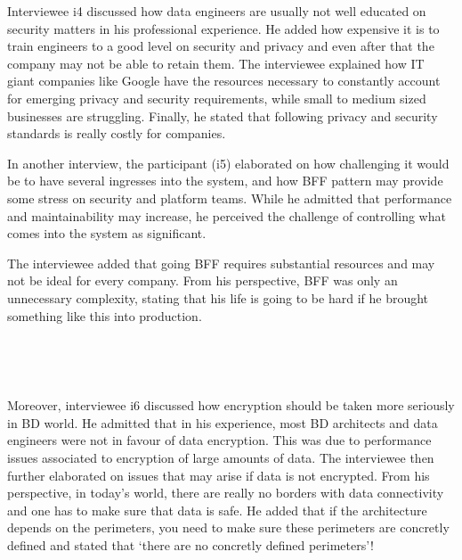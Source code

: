 \documentclass{bmcart}
\begin{document}
Interviewee i4 discussed how data engineers are usually not well educated on security matters in his professional experience. He added how expensive it is to train engineers to a good level on security and privacy and even after that the company may not be able to retain them. The interviewee explained how IT giant companies like Google have the resources necessary to constantly account for emerging privacy and security requirements, while small to medium sized businesses are struggling. Finally, he stated that following privacy and security standards is really costly for companies.

In another interview, the participant (i5) elaborated on how challenging it would be to have several ingresses into the system, and how BFF pattern may provide some stress on security and platform teams. While he admitted that performance and maintainability may increase, he perceived the challenge of controlling what comes into the system as significant. 

The interviewee added that going BFF requires substantial resources and may not be ideal for every company. From his perspective, BFF was only an unnecessary complexity, stating that his life is going to be hard if he brought something like this into production.

\,

\setlength{\fboxsep}{0.7em}
\noindent{}

\,

Moreover, interviewee i6 discussed how encryption should be taken more seriously in BD world. He admitted that in his experience, most BD architects and data engineers were not in favour of data encryption. This was due to performance issues associated to encryption of large amounts of data. The interviewee then further elaborated on issues that may arise if data is not encrypted. From his perspective, in today's world, there are really no borders with data connectivity and one has to make sure that data is safe. He added that if the architecture depends on the perimeters, you need to make sure these perimeters are concretly defined and stated that `there are no concretly defined perimeters'! 

\,

\setlength{\fboxsep}{0.7em}
\noindent{}
\end{document}
